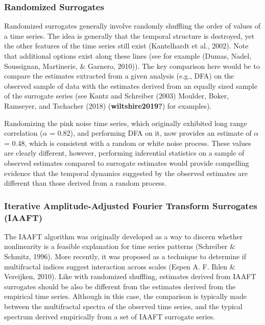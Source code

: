 \documentclass[
  man]{apa6}
\begin{document}
\hypertarget{randomized-surrogates}{%
\subsubsection{Randomized Surrogates}\label{randomized-surrogates}}

Randomized surrogates generally involve randomly shuffling the order of
values of a time series. The idea is generally that the temporal
structure is destroyed, yet the other features of the time series still
exist (Kantelhardt et al., 2002). Note that
additional options exist along these lines (see for example
(Dumas, Nadel, Soussignan, Martinerie, \& Garnero, 2010)). The key comparison here
would be to compare the estimates extracted from a given analysis (e.g.,
DFA) on the observed sample of data with the estimates derived from an
equally sized sample of the surrogate series (see Kantz and Schreiber (2003)
Moulder, Boker, Ramseyer, and Tschacher (2018) (\textbf{wiltshire2019?}) for examples).

Randomizing the pink noise time series, which originally exhibited long
range correlation (\(\alpha\) = 0.82), and performing DFA on
it, now provides an estimate of \(\alpha\) = 0.48,
which is consistent with a random or white noise process. These values
are clearly different, however, performing inferential statistics on a
sample of observed estimates compared to surrogate estimates would
provide compelling evidence that the temporal dynamics suggested by the
observed estimates are different than those derived from a random
process.

\hypertarget{iterative-amplitude-adjusted-fourier-transform-surrogates-iaaft}{%
\subsubsection{Iterative Amplitude-Adjusted Fourier Transform Surrogates (IAAFT)}\label{iterative-amplitude-adjusted-fourier-transform-surrogates-iaaft}}

The IAAFT algorithm was originally developed as a way to discern whether
nonlinearity is a feasible explanation for time series patterns
(Schreiber \& Schmitz, 1996). More recently, it was proposed as a technique to
determine if multifractal indices suggest interaction across scales
(Espen A. F. Ihlen \& Vereijken, 2010). Like with randomized shuffling, estimates derived from
IAAFT surrogates should be also be different from the estimates derived
from the empirical time series. Although in this case, the comparison is
typically made between the multifractal spectra of the observed time
series, and the typical spectrum derived empirically from a set of IAAFT
surrogate series.
\end{document}
